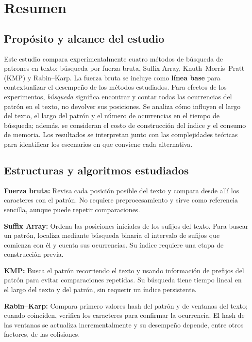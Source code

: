 \section{Resumen}
\subsection{Propósito y alcance del estudio}

Este estudio compara experimentalmente cuatro métodos de búsqueda de patrones
en texto: búsqueda por fuerza bruta, Suffix Array,
Knuth--Morris--Pratt (KMP) y Rabin--Karp. La fuerza bruta se incluye como
\textbf{línea base} para contextualizar el desempeño de los métodos estudiados.
Para efectos de los experimentos, \textit{búsqueda} significa encontrar y
contar todas las ocurrencias del patrón en el texto, no devolver sus posiciones.
Se analiza cómo influyen el largo del texto, el largo del patrón y el número de
ocurrencias en el tiempo de búsqueda; además, se consideran el costo de
construcción del índice y el consumo de memoria. Los resultados se interpretan
junto con las complejidades teóricas para identificar los escenarios en que
conviene cada alternativa.

\subsection{Estructuras y algoritmos estudiados}

\textbf{Fuerza bruta:} Revisa cada posición posible del texto y compara desde
allí los caracteres con el patrón. No requiere preprocesamiento y sirve como
referencia sencilla, aunque puede repetir comparaciones.

\textbf{Suffix Array:} Ordena las posiciones iniciales de los sufijos del
texto. Para buscar un patrón, localiza mediante búsqueda binaria el intervalo
de sufijos que comienza con él y cuenta sus ocurrencias. Su índice requiere
una etapa de construcción previa.

\textbf{KMP:} Busca el patrón recorriendo el texto y usando información de prefijos del
patrón para evitar comparaciones repetidas. Su búsqueda tiene tiempo lineal en
el largo del texto y del patrón, sin requerir un índice persistente.

\textbf{Rabin--Karp:} Compara primero valores hash del patrón y de ventanas del texto;
cuando coinciden, verifica los caracteres para confirmar la ocurrencia. El
hash de las ventanas se actualiza incrementalmente y su desempeño depende,
entre otros factores, de las colisiones.
